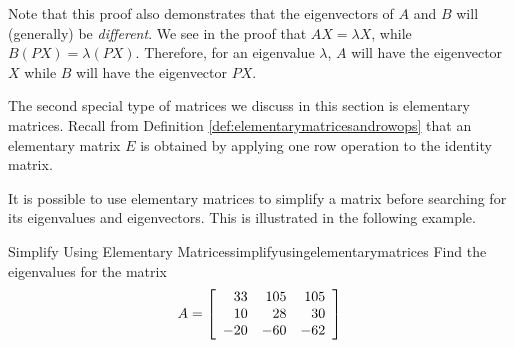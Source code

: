 Note that this proof also demonstrates that the eigenvectors of $A$ and $B$ will (generally) be {\em different\em}.
We see in the proof that $AX = \lambda X$, while $B \left(PX\right)=\lambda \left(PX\right)$. Therefore,
for an eigenvalue $\lambda$, $A$ will have the eigenvector $X$ while $B$ will have the eigenvector $PX$. 


The second special type of matrices we discuss in this section is elementary matrices.  
Recall from Definition \ref{def:elementarymatricesandrowops} that an elementary matrix $E$ is obtained by applying
one row operation to the identity matrix. 

It is possible to use elementary matrices to simplify a matrix before searching for its
eigenvalues and eigenvectors. This is illustrated in the following
example.

\begin{example}{Simplify Using Elementary Matrices}{simplifyusingelementarymatrices}
Find the eigenvalues for the matrix
\begin{equation*}
A = \left[
\begin{array}{rrr}
 33 & 105 & 105 \\
 10 &  28 & 30 \\
-20 & -60 & -62
\end{array}
\right]
\end{equation*}
\end{example}

